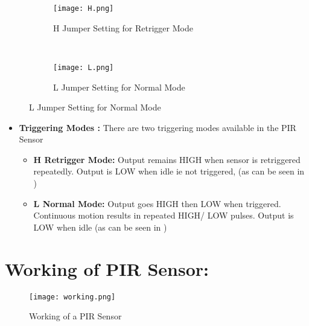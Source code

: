 \documentclass[a4paper,12 pt]{article}
\begin{document}
\begin{figure}[h]
        \centering
        \begin{subfigure}[b]{0.45\textwidth}
                \texttt{[image: H.png]}
                \caption{ H Jumper Setting for Retrigger Mode}
                \label{fig:6a}
        \end{subfigure}%
        ~ %
        \begin{subfigure}[b]{0.45\textwidth}
                \texttt{[image: L.png]}
                \caption{L Jumper Setting for Normal Mode}
                \label{fig:6b}
        \end{subfigure}
        
\end{figure}

\begin{itemize}
\item \textbf{Triggering Modes :} There are two triggering modes available in the PIR Sensor

\begin{itemize}
\item \textbf{H Retrigger Mode: }
Output remains HIGH when sensor is retriggered repeatedly. Output is LOW when idle ie not triggered, (as can be seen in )

\item \textbf{L Normal Mode:}
Output goes HIGH then LOW when triggered. Continuous motion results in repeated HIGH/ LOW pulses. Output is LOW when idle (as can be seen in )
\end{itemize}
\end{itemize}

\section{Working of PIR Sensor:} 

\begin{figure}[h]
\begin{center}
\texttt{[image: working.png]}
\caption{Working of a PIR Sensor}
\label{fig:7}
\end{center}
\end{figure}
\end{document}

